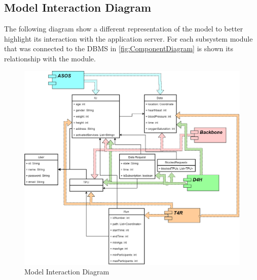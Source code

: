 \subsection{Model Interaction Diagram}
The following diagram show a different representation of the model to better highlight its interaction with the application server. For each subsystem module that was connected to the DBMS in \ref{fig:ComponentDiagram} is shown its relationship with the module. 
\begin{figure}[H]
\caption{Model Interaction Diagram}
\label{fig:ModelInteractionDiagram}
\centering
\includegraphics[width = \textwidth]{sections/architecturalDesign/modelInteractionDiagram.png}
\end{figure}
\clearpage
